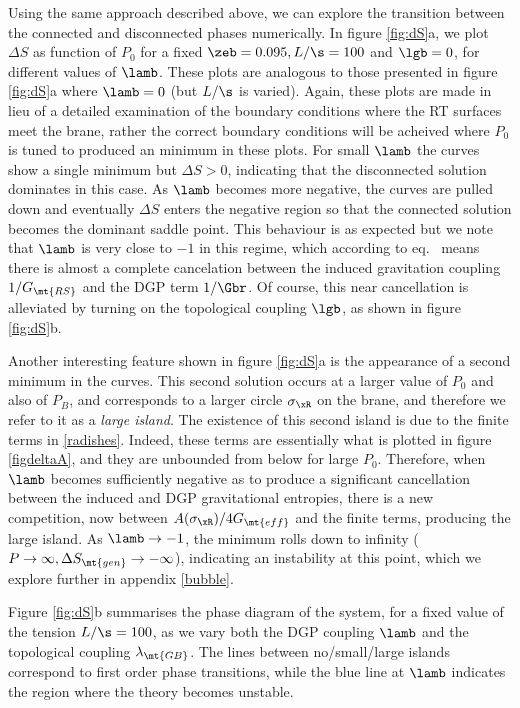 Using the same approach described above, we can explore the transition between the connected and disconnected phases numerically. In figure \ref{fig:dS}a, we plot $\Delta S$ as function of $P_0$ for a fixed $\zeb=0.095,L/\s=100$ and $\lgb=0$, for different values of $\lamb$. These plots are analogous to those presented in figure \ref{fig:dS}a where $\lamb=0$ (but $L/\s$ is varied). Again, these plots are made in lieu of a detailed examination of the boundary conditions where the RT surfaces meet the brane, rather the correct boundary conditions  will be acheived where $P_0$ is tuned to produced an minimum in these plots. For small $\lamb$ the curves show a single minimum but $\Delta S>0$, indicating that the disconnected solution dominates in this case. As $\lamb$ becomes more negative, the curves are pulled down and eventually $\Delta S$ enters the negative region so that the connected solution becomes the dominant saddle point. This behaviour is as expected but we note that $\lamb$ is very close to $-1$ in this regime, which according to eq.~ means there is almost a complete cancelation between the induced gravitation coupling $1/G_\mt{RS}$ and the DGP term $1/\Gbr$. Of course, this near cancellation is alleviated by turning on the topological coupling $\lgb$, as shown in figure \ref{fig:dS}b. 

Another interesting feature shown in figure \ref{fig:dS}a is the appearance of a second minimum in the curves. This second solution occurs at a larger value of $P_0$ and also of $P_B$, and corresponds to a larger circle $\sigma_\xR$ on the brane, and therefore we refer to it as a \textit{large island}. The existence of this second island is due to the finite terms in \eqref{radishes}. Indeed, these terms are essentially what is plotted in figure \ref{figdeltaA}, and they are unbounded from below for large $P_0$. Therefore, when $\lamb$ becomes sufficiently negative as to produce a significant cancellation between the induced and DGP gravitational entropies, there is a new competition, now between $A(\sigma_\xR)/4G_\mt{eff}$ and the finite terms, producing the large island. As $\lamb\to-1$, the minimum rolls down to infinity ($P\to \infty,\Delta S_{\mt{gen}}\to-\infty$), indicating an instability at this point, which we explore further in appendix \ref{bubble}.

Figure \ref{fig:dS}b summarises the phase diagram of the system, for a fixed value of the tension $L/\s=100$, as we vary both the DGP coupling $\lamb$ and the topological coupling $\lambda_{\mt{GB}}$. The lines between no/small/large islands correspond to first order phase transitions, while the blue line at $\lamb$ indicates the region where the theory becomes unstable. 


